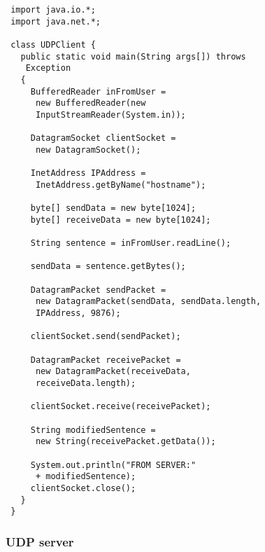 \documentclass[10pt, a4paper, twocolumn]{scrartcl}
\begin{document}
\begin{verbatim}
 import java.io.*;
 import java.net.*;

 class UDPClient {
   public static void main(String args[]) throws
    Exception
   {
     BufferedReader inFromUser =
      new BufferedReader(new
      InputStreamReader(System.in));
     
     DatagramSocket clientSocket =
      new DatagramSocket();

     InetAddress IPAddress =
      InetAddress.getByName("hostname");

     byte[] sendData = new byte[1024];
     byte[] receiveData = new byte[1024];

     String sentence = inFromUser.readLine();

     sendData = sentence.getBytes();

     DatagramPacket sendPacket =
      new DatagramPacket(sendData, sendData.length,
      IPAddress, 9876);

     clientSocket.send(sendPacket);

     DatagramPacket receivePacket =
      new DatagramPacket(receiveData,
      receiveData.length);

     clientSocket.receive(receivePacket);

     String modifiedSentence =
      new String(receivePacket.getData());

     System.out.println("FROM SERVER:"
      + modifiedSentence);
     clientSocket.close();
   }
 }
\end{verbatim}

\subsubsection{UDP server}
\end{document}
